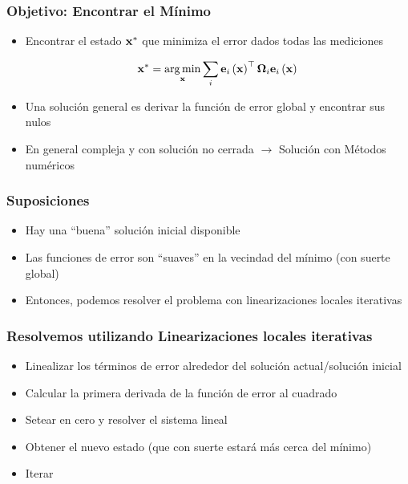 \begin{frame}
    \frametitle{Objetivo: Encontrar el Mínimo}
    
    \begin{itemize}
        \item Encontrar el estado $\boldsymbol{\mathbf{x}}^{*}$ que minimiza el error dados todas las mediciones
        
        \begin{equation*}
            \boldsymbol{\mathbf{x}}^{*} = \operatorname*{arg\,min}_{\boldsymbol{\mathbf{x}}} \sum_{i} \boldsymbol{\mathbf{e}}_{i}\left( \boldsymbol{\mathbf{x}} \right)^{\top} \boldsymbol{\mathbf{\Omega}}_{i} \boldsymbol{\mathbf{e}}_{i}\left( \boldsymbol{\mathbf{x}} \right)
        \end{equation*}
        
        
        \item Una solución general es derivar la función de error global y encontrar sus nulos
        \item En general compleja y con solución no cerrada $\rightarrow$ Solución con Métodos numéricos
    \end{itemize}
    
\end{frame}


\begin{frame}
    \frametitle{Suposiciones}
    \begin{itemize}
        \item Hay una ``buena'' solución inicial disponible
        \item Las funciones de error son ``suaves'' en la vecindad del mínimo (con suerte global)
        \item Entonces, podemos resolver el problema con linearizaciones locales iterativas
    \end{itemize}

\end{frame}

\begin{frame}
    \frametitle{Resolvemos utilizando Linearizaciones locales iterativas}
    \begin{itemize}
        \item Linealizar los términos de error alrededor del solución actual/solución inicial
        \item Calcular la primera derivada de la función de error al cuadrado
        \item Setear en cero y resolver el sistema lineal
        \item Obtener el nuevo estado (que con suerte estará más cerca del mínimo)
        \item Iterar
    \end{itemize}
\end{frame}


